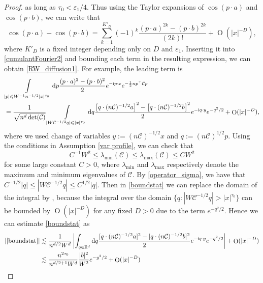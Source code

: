 \documentclass{article}
\newcommand{\1}{\mathds{1}}
\numberwithin{equation}{section}
\newcommand{\rd}{{\rm d}}
\newcommand{\al}{\alpha}
\newcommand{\be}{\begin{equation}}
\newcommand{\ee}{\end{equation}}
\newcommand{\e}{{\varepsilon}}
\renewcommand{\cal}{\mathcal}
\newcommand{\ii}{\mathrm{i}} %
\renewcommand{\leq}{\leqslant}
\renewcommand{\le}{\leq}
\newcommand{\R}{\mathbb{R}}
\DeclareMathOperator{\OO}{O}
\theoremstyle{plain} %
\theoremstyle{remark}
\begin{document}
\begin{proof}
as long as $\tau_0<\e_1/4$. Thus using the Taylor expansions of $\cos(p\cdot a)$ and $\cos(p\cdot b)$, we can write that
 \be\label{Taylorcos}\cos\left(p\cdot a\right)-\cos\left(p\cdot b\right) = \sum_{k=1}^{K'_D} (-1)^k \frac{(p\cdot a)^{2k}-(p\cdot b)^{2k}}{(2k)!}+\OO(|x|^{-D}),\ee
where $K'_D$ is a fixed integer depending only on $D$ and $\e_1$.  Inserting it into \eqref{cumulantFourier2} and 
bounding each term in the resulting expression, we can obtain \eqref{RW_diffusion1}. 
For example, the leading term is   
 \begin{align} 
&  \int\limits_{|p| \le W^{-1}n^{- 1/2}|x|^{\tau_0}} \rd p \frac{(p\cdot a)^{2}-(p\cdot b)^{2}}{2}  e^{-\ii p\cdot x}e^{-\frac12 n p^\top\cal C p} \nonumber\\ %
& =\frac{1}{ \sqrt{ n^d \det(\cal C)}} \int\limits_{|W\cal C^{-1/2}q|\le |x|^{\tau_0}} \rd q \frac{\left[q\cdot (n\cal C)^{-1/2}a\right]^{2}-\left[q\cdot (n\cal C)^{-1/2}b\right]^{2}}{2}e^{ -\ii q \cdot y}e^{-{q^2}/{2}} %
 +\OO(|x|^{-D}) ,\label{boundstat}
\end{align}
where we used change of variables $ y:=(n\cal C)^{-1/2}x$ and $q:=(n\cal C)^{1/2}p$. Using the conditions in Assumption \ref{var profile}, we can check that
\be\label{operator_sigma}
C^{-1}W^{2}\le \lambda_{\min}(\cal C)\le \lambda_{\max}(\cal C) \le CW^2
\ee
for some large constant $C>0$, where $\lambda_{\min}$ and $\lambda_{\max}$ respectively denote the maximum and minimum eigenvalues of $\cal C$. By \eqref{operator_sigma}, we have that $C^{-1/2}|q|\le |W\cal C^{-1/2}q|\le C^{1/2}|q|$. Then in \eqref{boundstat} we can replace the domain of the integral by \smash{$\int_{q\in \R^d}$}, because the integral over the domain $\{q:|W\cal C^{-1/2}q|>|x|^{\tau_0}\}$ can be bounded by $\OO(|x|^{-D})$ for any fixed $D>0$ due to the term $e^{-q^2/2}$. Hence we can estimate \eqref{boundstat} as
\begin{align*}
 |\eqref{boundstat}| &\lesssim \frac{1}{n^{d/2}W^d} \left|\int_{q\in \R^d} \rd q \frac{[q\cdot (n\cal C)^{-1/2}a]^{2}-[q\cdot (n\cal C)^{-1/2}b]^{2}}{2}  e^{-\ii q\cdot y}e^{-{q^2}/2} \right|+\OO(|x|^{-D})\\
&\lesssim \frac{n^{2\tau_0} }{n^{d/2+1}W^d}\frac{|b|^2}{W^2} e^{-y^2/2} +\OO(|x|^{-D}) 

\end{align*}
\end{proof}
\end{document}

